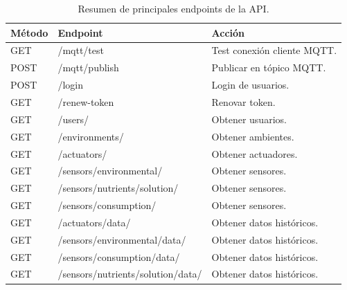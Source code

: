 \begin{table}[H]
    \centering
    \caption[Resumen de principales endpoints de la API]{Resumen de principales endpoints de la API.}
    \begin{tabular}{l l l}
        \toprule
        \textbf{Método} & \textbf{Endpoint}                 & \textbf{Acción}             \\
        \midrule
        GET             & /mqtt/test                        & Test conexión cliente MQTT. \\
        POST            & /mqtt/publish                     & Publicar en tópico MQTT.    \\
        \midrule
        POST            & /login                            & Login de usuarios.          \\
        GET             & /renew-token                      & Renovar token.              \\
        \midrule
        GET             & /users/                           & Obtener usuarios.           \\
        \midrule
        GET             & /environments/                    & Obtener ambientes.          \\
        \midrule
        GET             & /actuators/                       & Obtener actuadores.         \\
        \midrule
        GET             & /sensors/environmental/           & Obtener sensores.           \\
        \midrule
        GET             & /sensors/nutrients/solution/      & Obtener sensores.           \\
        \midrule
        GET             & /sensors/consumption/             & Obtener sensores.           \\
        \midrule
        GET             & /actuators/data/                  & Obtener datos históricos.   \\
        GET             & /sensors/environmental/data/      & Obtener datos históricos.   \\
        GET             & /sensors/consumption/data/        & Obtener datos históricos.   \\
        GET             & /sensors/nutrients/solution/data/ & Obtener datos históricos.   \\
        \bottomrule
        \hline
    \end{tabular}
    \label{tab:endpoints}
\end{table}

